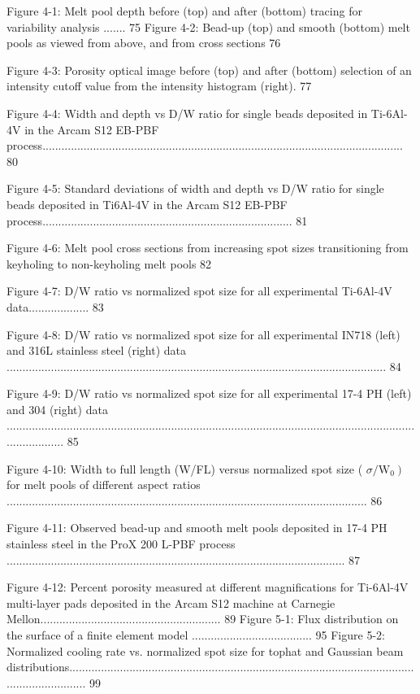 \documentclass[10pt]{article}
\begin{document}
Figure 4-1: Melt pool depth before (top) and after (bottom) tracing for variability analysis ....... 75 Figure 4-2: Bead-up (top) and smooth (bottom) melt pools as viewed from above, and from cross sections 76

Figure 4-3: Porosity optical image before (top) and after (bottom) selection of an intensity cutoff value from the intensity histogram (right). 77

Figure 4-4: Width and depth vs D/W ratio for single beads deposited in Ti-6Al-4V in the Arcam S12 EB-PBF process.................................................................................................................. 80

Figure 4-5: Standard deviations of width and depth vs D/W ratio for single beads deposited in Ti6Al-4V in the Arcam S12 EB-PBF process............................................................................... 81

Figure 4-6: Melt pool cross sections from increasing spot sizes transitioning from keyholing to non-keyholing melt pools 82

Figure 4-7: D/W ratio vs normalized spot size for all experimental Ti-6Al-4V data................... 83

Figure 4-8: D/W ratio vs normalized spot size for all experimental IN718 (left) and 316L stainless steel (right) data ........................................................................................................................ 84

Figure 4-9: D/W ratio vs normalized spot size for all experimental 17-4 PH (left) and 304 (right) data ................................................................................................................................................... 85

Figure 4-10: Width to full length (W/FL) versus normalized spot size ( $\left.\sigma / \mathrm{W}_{0}\right)$ for melt pools of different aspect ratios .................................................................................................................. 86

Figure 4-11: Observed bead-up and smooth melt pools deposited in 17-4 PH stainless steel in the ProX 200 L-PBF process ........................................................................................................... 87

Figure 4-12: Percent porosity measured at different magnifications for Ti-6Al-4V multi-layer pads deposited in the Arcam S12 machine at Carnegie Mellon......................................................... 89 Figure 5-1: Flux distribution on the surface of a finite element model ...................................... 95 Figure 5-2: Normalized cooling rate vs. normalized spot size for tophat and Gaussian beam distributions...................................................................................................................................... 99
\end{document}
